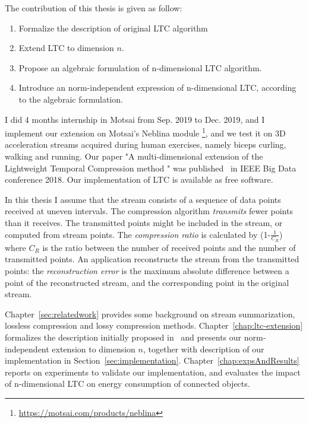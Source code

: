 
The contribution of this thesis is given as follow:
\begin{enumerate}
  \item Formalize the description of original LTC algorithm
  \item Extend LTC to dimension $n$.
  \item Propose an algebraic formulation of n-dimensional LTC algorithm.
  \item Introduce an norm-independent expression of n-dimensional LTC, according to
  the algebraic formulation.
\end{enumerate}


I did 4 months internship in Motsai from Sep. 2019 to Dec. 2019, and I implement
our extension on  Motsai's Neblina module
\footnote{\url{https://motsai.com/products/neblina}}, and we test it on 3D
acceleration streams acquired during human exercises, namely biceps curling,
walking and  running. Our paper "A multi-dimensional extension of the
Lightweight Temporal Compression method " was published~\cite{li2018multi} in
IEEE Big Data conference 2018. Our implementation of LTC is available as free
software.



In this thesis I assume that the stream consists of a sequence of data points
received at uneven intervals. The compression algorithm  \emph{transmits} fewer
points than it receives. The transmitted points  might be included in the
stream, or computed from stream points. The  \emph{compression ratio} is
calculated by (1-$\frac{1}{C_R}$) where $C_R$ is the ratio between the number of
received points and the number of transmitted points. An application
reconstructs the stream from the transmitted points: the  \emph{reconstruction
error} is the maximum absolute difference between  a point of the reconstructed
stream, and the corresponding  point in the original stream.


Chapter~\ref{sec:relatedwork} provides some background on stream summarization,
lossless compression and lossy compression methods.
Chapter~\ref{chap:ltc-extension} formalizes the description initially proposed
in~\cite{schoellhammer2004lightweight} and presents our norm-independent
extension to dimension $n$, together with description of our implementation in
Section~\ref{sec:implementation}. Chapter~\ref{chap:expsAndResults} reports on
experiments to validate our  implementation, and evaluates the impact of
n-dimensional LTC on  energy consumption of connected objects.






